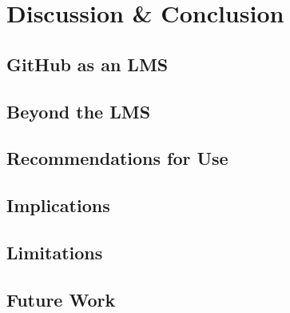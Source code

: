 \chapter{Discussion & Conclusion}

\section{GitHub as an LMS}

\section{Beyond the LMS}

\section{Recommendations for Use}

\section{Implications}

\section{Limitations}

\section{Future Work}
